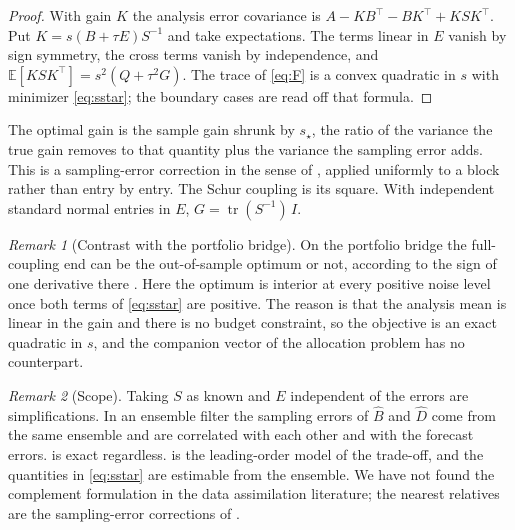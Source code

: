 \documentclass[11pt]{article}
\theoremstyle{remark}
\newtheorem{remark}{Remark}
\newcommand{\E}{\mathbb{E}}
\DeclareMathOperator{\tr}{tr}
\begin{document}
\begin{proof}
With gain $K$ the analysis error covariance is
$A-KB^\top-BK^\top+KSK^\top$. Put $K=s(B+\tau E)S^{-1}$ and take
expectations. The terms linear in $E$ vanish by sign symmetry, the cross
terms vanish by independence, and $\E[KSK^\top]=s^2(Q+\tau^2G)$. The trace
of \eqref{eq:F} is a convex quadratic in $s$ with minimizer
\eqref{eq:sstar}; the boundary cases are read off that formula.
\end{proof}

The optimal gain is the sample gain shrunk by $s_\star$, the ratio of the
variance the true gain removes to that quantity plus the variance the
sampling error adds. This is a sampling-error correction in the sense of
\cite{anderson2012}, applied uniformly to a block rather than entry by
entry. The Schur coupling is its square. With independent standard normal
entries in $E$, $G=\tr(S^{-1})\,I$.

\begin{remark}[Contrast with the portfolio bridge]
On the portfolio bridge the full-coupling end can be the out-of-sample
optimum or not, according to the sign of one derivative there
\cite{cotton2026bridge,cotton2026nco}. Here the optimum is interior at
every positive noise level once both terms of \eqref{eq:sstar} are
positive. The reason is that the analysis mean is linear in the
gain and there is no budget constraint, so the objective is an exact
quadratic in $s$, and the companion vector of the allocation problem has no
counterpart.
\end{remark}

\begin{remark}[Scope]
Taking $S$ as known and $E$ independent of the errors are simplifications.
In an ensemble filter the sampling errors of $\widehat B$ and $\widehat D$
come from the same ensemble and are correlated with each other and with the
forecast errors.  is exact regardless. 
is the leading-order model of the trade-off, and the quantities in
\eqref{eq:sstar} are estimable from the ensemble. We have not found the
complement formulation in the data assimilation literature; the nearest
relatives are the sampling-error corrections of \cite{anderson2007,anderson2012}.
\end{remark}
\end{document}
